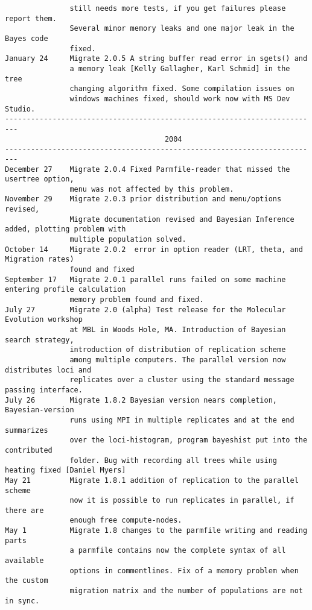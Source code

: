 \begin{small}
\begin{verbatim}
               still needs more tests, if you get failures please report them.
               Several minor memory leaks and one major leak in the Bayes code
               fixed.  
January 24     Migrate 2.0.5 A string buffer read error in sgets() and 
               a memory leak [Kelly Gallagher, Karl Schmid] in the tree 
               changing algorithm fixed. Some compilation issues on 
               windows machines fixed, should work now with MS Dev Studio. 
-------------------------------------------------------------------------
                                     2004
-------------------------------------------------------------------------
December 27    Migrate 2.0.4 Fixed Parmfile-reader that missed the usertree option, 
               menu was not affected by this problem.
November 29    Migrate 2.0.3 prior distribution and menu/options revised,
               Migrate documentation revised and Bayesian Inference added, plotting problem with
               multiple population solved.
October 14     Migrate 2.0.2  error in option reader (LRT, theta, and Migration rates) 
               found and fixed
September 17   Migrate 2.0.1 parallel runs failed on some machine entering profile calculation
               memory problem found and fixed.
July 27        Migrate 2.0 (alpha) Test release for the Molecular Evolution workshop
               at MBL in Woods Hole, MA. Introduction of Bayesian search strategy, 
               introduction of distribution of replication scheme 
               among multiple computers. The parallel version now distributes loci and 
               replicates over a cluster using the standard message passing interface.             
July 26        Migrate 1.8.2 Bayesian version nears completion, Bayesian-version
               runs using MPI in multiple replicates and at the end summarizes 
               over the loci-histogram, program bayeshist put into the contributed 
               folder. Bug with recording all trees while using heating fixed [Daniel Myers]
May 21         Migrate 1.8.1 addition of replication to the parallel scheme
               now it is possible to run replicates in parallel, if there are
               enough free compute-nodes.
May 1          Migrate 1.8 changes to the parmfile writing and reading parts
               a parmfile contains now the complete syntax of all available
               options in commentlines. Fix of a memory problem when the custom
               migration matrix and the number of populations are not in sync.


\end{verbatim}
\end{small}
